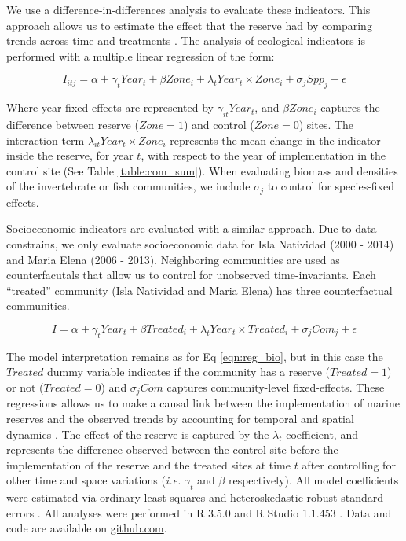 \documentclass{frontiersSCNS}
\begin{document}
We use a difference-in-differences analysis to evaluate these
indicators. This approach allows us to estimate the effect that the
reserve had by comparing trends across time and treatments
\citep{moland_2013-VP,Villasenor-Derbez_2018}. The analysis of
ecological indicators is performed with a multiple linear regression of
the form:

\begin{equation}
I_{itj} = \alpha + \gamma_{t} Year_t + \beta Zone_i + \lambda_{t} Year_t\times Zone_i + \sigma_jSpp_j + \epsilon
\label{eqn:reg_bio}
\end{equation}

Where year-fixed effects are represented by \(\gamma_{it} Year_t\), and
\(\beta Zone_i\) captures the difference between reserve (\(Zone = 1\))
and control (\(Zone = 0\)) sites. The interaction term
\(\lambda_{it} Year_t\times Zone_i\) represents the mean change in the
indicator inside the reserve, for year \(t\), with respect to the year
of implementation in the control site (See Table \ref{table:com_sum}).
When evaluating biomass and densities of the invertebrate or fish
communities, we include \(\sigma_j\) to control for species-fixed
effects.

Socioeconomic indicators are evaluated with a similar approach. Due to
data constrains, we only evaluate socioeconomic data for Isla Natividad
(2000 - 2014) and Maria Elena (2006 - 2013). Neighboring communities are
used as counterfacutals that allow us to control for unobserved
time-invariants. Each ``treated'' community (Isla Natividad and Maria
Elena) has three counterfactual communities.

\begin{equation}
I = \alpha + \gamma_{t} Year_t + \beta Treated_i + \lambda_{t} Year_t\times Treated_i + \sigma_jCom_j +\epsilon
\label{eqn:soc_reg}
\end{equation}

The model interpretation remains as for Eq \ref{eqn:reg_bio}, but in
this case the \(Treated\) dummy variable indicates if the community has
a reserve (\(Treated = 1\)) or not (\(Treated = 0\)) and \(\sigma_jCom\)
captures community-level fixed-effects. These regressions allows us to
make a causal link between the implementation of marine reserves and the
observed trends by accounting for temporal and spatial dynamics
\citep{depalma_2018}. The effect of the reserve is captured by the
\(\lambda_t\) coefficient, and represents the difference observed
between the control site before the implementation of the reserve and
the treated sites at time \(t\) after controlling for other time and
space variations (\emph{i.e.} \(\gamma_t\) and \(\beta\) respectively).
All model coefficients were estimated via ordinary least-squares and
heteroskedastic-robust standard errors \citep{zeileis_2004-7n}. All
analyses were performed in R 3.5.0 and R Studio 1.1.453 \citep{R_2018}.
Data and code are available on
\href{https://github.com/jcvdav/ReserveEffect}{github.com}.
\end{document}
